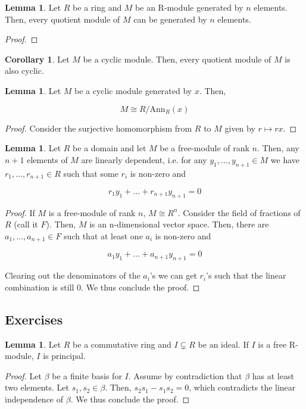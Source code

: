 \documentclass{article}
\theoremstyle{definition}
\newtheorem{lemma}[theorem]{Lemma}
\newtheorem{corollary}{Corollary}[theorem]
\begin{document}
\begin{lemma}
    Let $R$ be a ring and $M$ be an R-module generated by $n$ elements. Then, every quotient module of $M$ can be generated by $n$ elements.
\end{lemma}
\begin{proof}

\end{proof}

\begin{corollary}
    Let $M$ be a cyclic module. Then, every quotient module of $M$ is also cyclic.
\end{corollary}

\begin{lemma}\label{cyclic_module_iso_to_r_mod_annihiliator}
    Let $M$ be a cyclic module generated by $x$. Then, 

    \[ M \cong R/\text{Ann}_{R}(x)\]
\end{lemma}
\begin{proof}
    Consider the surjective homomorphism from $R$ to $M$ given by $r \mapsto rx$.
\end{proof}


\begin{lemma}
    Let $R$ be a domain and let $M$ be a free-module of rank $n$. Then, any $n + 1$ elements of $M$ are linearly dependent, i.e. for any $y_{1}, ..., y_{n+1} \in M$ we have $r_{1},...,r_{n+1} \in R$ such that some $r_{i}$ is non-zero and

    \[ r_{1}y_{1} + ... + r_{n+1}y_{n+1} = 0\]
\end{lemma}
\begin{proof}
    If $M$ is a free-module of rank $n$, $M \cong R^{n}$. Consider the field of fractions of $R$ (call it $F$). Then, $M$ is an n-dimensional vector space. Then, there are $a_{1}, ..., a_{n+1} \in F$ such that at least one $a_{i}$ is non-zero and

    \[ a_{1}y_{1} + ... + a_{n+1}y_{n+1} = 0\]

    Clearing out the denominators of the $a_{i}$'s we can get $r_{i}$'s such that the linear combination is still 0. We thus conclude the proof.
\end{proof}

\subsection{Exercises}

\begin{lemma}\label{free_ideals_are_principal}
    Let $R$ be a commutative ring and $I \subsetneq R$ be an ideal. If $I$ is a free R-module, $I$ is principal. 
\end{lemma}
\begin{proof}
    Let $\beta$ be a finite basis for $I$. Assume by contradiction that $\beta$ has at least two elements. Let $s_{1},s_{2} \in \beta$. Then, $s_{2}s_{1} - s_{1}s_{2} = 0$, which contradicts the linear independence of $\beta$. We thus conclude the proof.
\end{proof}
\end{document}
